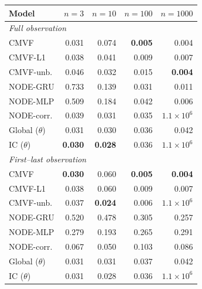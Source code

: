 \begin{tabular}{lrrrr}
\toprule
Model & $n{=}3$ & $n{=}10$ & $n{=}100$ & $n{=}1000$ \\
\midrule
\multicolumn{5}{l}{\emph{Full observation}} \\
CMVF & 0.031 & 0.074 & \textbf{0.005} & 0.004 \\
CMVF-L1 & 0.038 & 0.041 & 0.009 & 0.007 \\
CMVF-unb. & 0.046 & 0.032 & 0.015 & \textbf{0.004} \\
NODE-GRU & 0.733 & 0.139 & 0.031 & 0.011 \\
NODE-MLP & 0.509 & 0.184 & 0.042 & 0.006 \\
NODE-corr. & 0.039 & 0.031 & 0.035 & $1.1\!\times\!10^{6}$ \\
Global ($\theta$) & 0.031 & 0.030 & 0.036 & 0.042 \\
IC ($\theta$) & \textbf{0.030} & \textbf{0.028} & 0.036 & $1.1\!\times\!10^{6}$ \\
\midrule
\multicolumn{5}{l}{\emph{First--last observation}} \\
CMVF & \textbf{0.030} & 0.060 & \textbf{0.005} & \textbf{0.004} \\
CMVF-L1 & 0.038 & 0.060 & 0.009 & 0.007 \\
CMVF-unb. & 0.037 & \textbf{0.024} & 0.006 & $1.1\!\times\!10^{6}$ \\
NODE-GRU & 0.520 & 0.478 & 0.305 & 0.257 \\
NODE-MLP & 0.279 & 0.193 & 0.265 & 0.291 \\
NODE-corr. & 0.067 & 0.050 & 0.103 & 0.086 \\
Global ($\theta$) & 0.031 & 0.031 & 0.037 & 0.042 \\
IC ($\theta$) & 0.031 & 0.028 & 0.036 & $1.1\!\times\!10^{6}$ \\
\bottomrule
\end{tabular}
